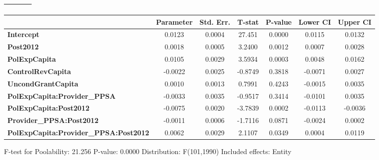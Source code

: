 \begin{center}
\begin{tabular}{lclc}
\textbf{}                                     &                    & \textbf{                     }   &                  \\
\bottomrule
\end{tabular}
\begin{tabular}{lcccccc}
                                              & \textbf{Parameter} & \textbf{Std. Err.} & \textbf{T-stat} & \textbf{P-value} & \textbf{Lower CI} & \textbf{Upper CI}  \\
\midrule
\textbf{Intercept}                            &       0.0123       &       0.0004       &      27.451     &      0.0000      &       0.0115      &       0.0132       \\
\textbf{Post2012}                             &       0.0018       &       0.0005       &      3.2400     &      0.0012      &       0.0007      &       0.0028       \\
\textbf{PolExpCapita}                         &       0.0105       &       0.0029       &      3.5934     &      0.0003      &       0.0048      &       0.0162       \\
\textbf{ControlRevCapita}                     &      -0.0022       &       0.0025       &     -0.8749     &      0.3818      &      -0.0071      &       0.0027       \\
\textbf{UncondGrantCapita}                    &       0.0010       &       0.0013       &      0.7991     &      0.4243      &      -0.0015      &       0.0035       \\
\textbf{PolExpCapita:Provider\_PPSA}          &      -0.0033       &       0.0035       &     -0.9517     &      0.3414      &      -0.0101      &       0.0035       \\
\textbf{PolExpCapita:Post2012}                &      -0.0075       &       0.0020       &     -3.7839     &      0.0002      &      -0.0113      &      -0.0036       \\
\textbf{Provider\_PPSA:Post2012}              &      -0.0011       &       0.0006       &     -1.7116     &      0.0871      &      -0.0024      &       0.0002       \\
\textbf{PolExpCapita:Provider\_PPSA:Post2012} &       0.0062       &       0.0029       &      2.1107     &      0.0349      &       0.0004      &       0.0119       \\
\bottomrule
\end{tabular}
\end{center}

F-test for Poolability: 21.256 \newline
 P-value: 0.0000 \newline
 Distribution: F(101,1990) \newline
  \newline
 Included effects: Entity